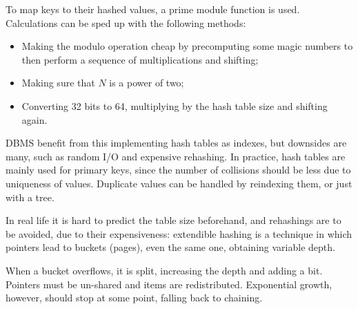 To map keys to their hashed values, a prime module function is used. Calculations can be sped up with the following methods:
\begin{itemize}
	\item Making the modulo operation cheap by precomputing some magic numbers to then perform a sequence of multiplications and shifting;
	\item Making sure that $N$ is a power of two;
	\item Converting 32 bits to 64, multiplying by the hash table size and shifting again.
\end{itemize}
DBMS benefit from this implementing hash tables as indexes, but downsides are many, such as random I/O and expensive rehashing. In practice, hash tables are mainly used for primary keys, since the number of collisions should be less due to uniqueness of values. Duplicate values can be handled by reindexing them, or just with a tree.

In real life it is hard to predict the table size beforehand, and rehashings are to be avoided, due to their expensiveness: extendible hashing is a technique in which pointers lead to buckets (pages), even the same one, obtaining variable depth.

When a bucket overflows, it is split, increasing the depth and adding a bit. Pointers must be un-shared and items are redistributed. Exponential growth, however, should stop at some point, falling back to chaining.




